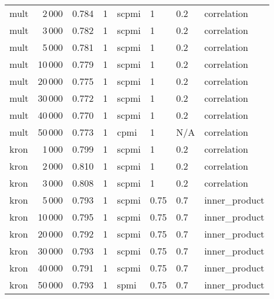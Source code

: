 \begin{tabular}{lrrlllll}
    mult &            2\,000 &  0.784 &     1 &  scpmi &       1 &  0.2 &    correlation \\
    mult &            3\,000 &  0.782 &     1 &  scpmi &       1 &  0.2 &    correlation \\
    mult &            5\,000 &  0.781 &     1 &  scpmi &       1 &  0.2 &    correlation \\
    mult &           10\,000 &  0.779 &     1 &  scpmi &       1 &  0.2 &    correlation \\
    mult &           20\,000 &  0.775 &     1 &  scpmi &       1 &  0.2 &    correlation \\
    mult &           30\,000 &  0.772 &     1 &  scpmi &       1 &  0.2 &    correlation \\
    mult &           40\,000 &  0.770 &     1 &  scpmi &       1 &  0.2 &    correlation \\
    mult &           50\,000 &  0.773 &     1 &   cpmi &       1 &  N/A &    correlation \\
    kron &            1\,000 &  0.799 &     1 &  scpmi &       1 &  0.2 &    correlation \\
    kron &            2\,000 &  0.810 &     1 &  scpmi &       1 &  0.2 &    correlation \\
    kron &            3\,000 &  0.808 &     1 &  scpmi &       1 &  0.2 &    correlation \\
    kron &            5\,000 &  0.793 &     1 &  scpmi &    0.75 &  0.7 &  inner\_product \\
    kron &           10\,000 &  0.795 &     1 &  scpmi &    0.75 &  0.7 &  inner\_product \\
    kron &           20\,000 &  0.792 &     1 &  scpmi &    0.75 &  0.7 &  inner\_product \\
    kron &           30\,000 &  0.793 &     1 &  scpmi &    0.75 &  0.7 &  inner\_product \\
    kron &           40\,000 &  0.791 &     1 &  scpmi &    0.75 &  0.7 &  inner\_product \\
    kron &           50\,000 &  0.793 &     1 &   spmi &    0.75 &  0.7 &  inner\_product \\
\bottomrule
\end{tabular}
